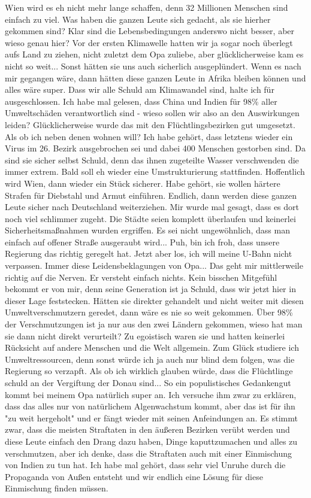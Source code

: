 \documentclass[twoside, a4paper, DIV=11, open=any, bibliography=totoc]{scrbook}
\begin{document}
Wien wird es eh nicht mehr lange schaffen, denn 32 Millionen Menschen
sind einfach zu viel.
Was haben die ganzen Leute sich gedacht, als sie hierher gekommen sind? Klar sind
die Lebensbedingungen anderswo
nicht besser, aber wieso genau hier? Vor der ersten Klimawelle hatten wir ja sogar
noch überlegt aufs Land zu
ziehen, nicht zuletzt dem Opa zuliebe, aber glücklicherweise kam es nicht so weit... 
Sonst hätten sie uns auch sicherlich ausgeplündert.
Wenn es nach mir gegangen wäre, dann hätten diese ganzen Leute in Afrika bleiben
können und alles wäre super.
Dass wir alle Schuld am Klimawandel sind, halte ich für ausgeschlossen. Ich habe
mal gelesen, dass China und
Indien für 98\% aller Umweltschäden verantwortlich sind - wieso sollen wir also an
den Auswirkungen leiden?
Glücklicherweise wurde das mit den Flüchtlingsbezirken gut umgesetzt. Als ob ich
neben denen wohnen will?
Ich habe gehört, dass letztens wieder ein Virus im 26. Bezirk ausgebrochen sei und
dabei 400 Menschen gestorben
sind. Da sind sie sicher selbst Schuld, denn das ihnen zugeteilte Wasser
verschwenden die immer extrem.
Bald soll eh wieder eine Umstrukturierung stattfinden. Hoffentlich wird Wien, dann
wieder ein Stück sicherer.
Habe gehört, sie wollen härtere Strafen für Diebstahl und Armut einführen. Endlich,
dann werden diese ganzen
Leute sicher nach Deutschland weiterziehen. Mir wurde mal gesagt, dass es dort noch
viel schlimmer zugeht.
Die Städte seien komplett überlaufen und keinerlei Sicherheitsmaßnahmen wurden
ergriffen. Es sei nicht
ungewöhnlich, dass man einfach auf offener Straße ausgeraubt wird... Puh, bin ich
froh, dass unsere Regierung
das richtig geregelt hat. Jetzt aber los, ich will meine U-Bahn nicht verpassen.
Immer diese Leidensbeklagungen von Opa... Das geht mir mittlerweile richtig auf die
Nerven. Er versteht einfach
nichts. Kein bisschen Mitgefühl bekommt er von mir, denn seine Generation ist ja
Schuld, dass wir jetzt hier
in dieser Lage feststecken. Hätten sie direkter gehandelt und nicht weiter mit
diesen Umweltverschmutzern
geredet, dann wäre es nie so weit gekommen. Über 98\% der Verschmutzungen ist ja nur
aus den zwei Ländern gekommen,
wieso hat man sie dann nicht direkt verurteilt? Zu egoistisch waren sie und hatten
keinerlei Rücksicht auf
andere Menschen und die Welt allgemein. Zum Glück studiere ich Umweltressourcen,
denn sonst würde ich ja auch
nur blind dem folgen, was die Regierung so verzapft. Als ob ich wirklich glauben
würde, dass die Flüchtlinge
schuld an der Vergiftung der Donau sind... So ein populistisches Gedankengut kommt
bei meinem Opa natürlich
super an. Ich versuche ihm zwar zu erklären, dass das alles nur von natürlichem
Algenwachstum kommt, aber
das ist für ihn "zu weit hergeholt" und er fängt wieder mit seinen Anfeindungen an.
Es stimmt zwar, dass die meisten Straftaten in den äußeren Bezirken verübt werden
und diese Leute einfach
den Drang dazu haben, Dinge kaputtzumachen und alles zu verschmutzen, aber ich
denke, dass die Straftaten auch
mit einer Einmischung von Indien zu tun hat. Ich habe mal gehört, dass sehr viel
Unruhe durch die Propaganda
von Außen entsteht und wir endlich eine Lösung für diese Einmischung finden müssen.
\end{document}
